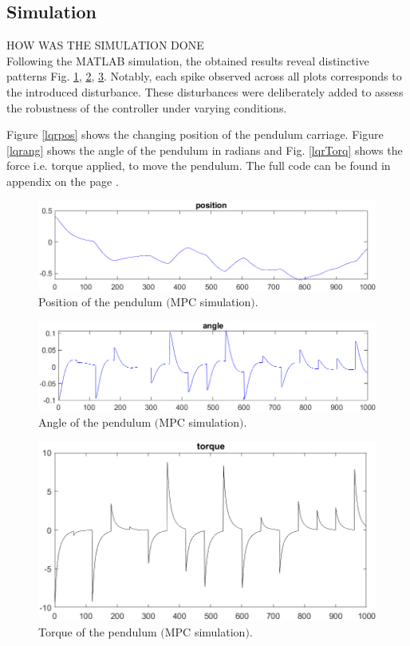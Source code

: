 \subsection{Simulation}

HOW WAS THE SIMULATION DONE\\

Following the MATLAB simulation, the obtained results reveal distinctive patterns Fig. \ref{mpcPos}, \ref{mpcAng}, \ref{mpcTor}. Notably, each spike observed across all plots corresponds to the introduced disturbance. These disturbances were deliberately added to assess the robustness of the controller under varying conditions.

Figure \ref{lqrpos} shows the changing position of the pendulum carriage. Figure \ref{lqrang} shows the angle of the pendulum in radians and Fig. \ref{lqrTorq} shows the force i.e. torque applied, to move the pendulum. The full code can be found in appendix on the page \pageref{mpcSim.m}.

\begin{figure}[!tbh]
	\centering
	\includegraphics[width=150mm]{obr/mpcPos.png}
	\caption{Position of the pendulum $($MPC simulation$)$.}\label{mpcPos}
\end{figure}

\begin{figure}[!tbh]
	\centering
	\includegraphics[width=150mm]{obr/mpcAng.png}
	\caption{Angle of the pendulum $($MPC simulation$)$.}\label{mpcAng}
\end{figure}

\begin{figure}[!tbh]
	\centering
	\includegraphics[width=150mm]{obr/mpcTor.png}
	\caption{Torque of the pendulum $($MPC simulation$)$.}\label{mpcTor}
\end{figure}

